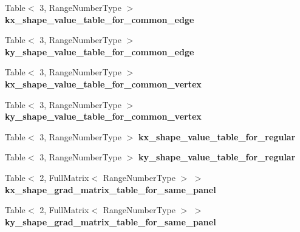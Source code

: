 \begin{DoxyCompactItemize}
\mbox{\label{classLaplaceBEM_1_1BEMValues_a8a1e35a97b8b4868d16098f9997a9148}} 
Table$<$ 3, Range\+Number\+Type $>$ {\bfseries kx\+\_\+shape\+\_\+value\+\_\+table\+\_\+for\+\_\+common\+\_\+edge}
\item 
\mbox{\label{classLaplaceBEM_1_1BEMValues_a26a0c28bae67e71bcd8e5b58c22096d3}} 
Table$<$ 3, Range\+Number\+Type $>$ {\bfseries ky\+\_\+shape\+\_\+value\+\_\+table\+\_\+for\+\_\+common\+\_\+edge}
\item 
\mbox{\label{classLaplaceBEM_1_1BEMValues_a8d2e45be4d32bae87467a9b249ea1ae8}} 
Table$<$ 3, Range\+Number\+Type $>$ {\bfseries kx\+\_\+shape\+\_\+value\+\_\+table\+\_\+for\+\_\+common\+\_\+vertex}
\item 
\mbox{\label{classLaplaceBEM_1_1BEMValues_ad9ef63cf6509fa3916ddf835293baf39}} 
Table$<$ 3, Range\+Number\+Type $>$ {\bfseries ky\+\_\+shape\+\_\+value\+\_\+table\+\_\+for\+\_\+common\+\_\+vertex}
\item 
\mbox{\label{classLaplaceBEM_1_1BEMValues_aef7b057d9bb7d63d74ac30c34b0add62}} 
Table$<$ 3, Range\+Number\+Type $>$ {\bfseries kx\+\_\+shape\+\_\+value\+\_\+table\+\_\+for\+\_\+regular}
\item 
\mbox{\label{classLaplaceBEM_1_1BEMValues_aec5f9fa16be14831e124275fe74921f0}} 
Table$<$ 3, Range\+Number\+Type $>$ {\bfseries ky\+\_\+shape\+\_\+value\+\_\+table\+\_\+for\+\_\+regular}
\item 
\mbox{\label{classLaplaceBEM_1_1BEMValues_a66a2d68e7fbc709fbca53c5d3158b288}} 
Table$<$ 2, Full\+Matrix$<$ Range\+Number\+Type $>$ $>$ {\bfseries kx\+\_\+shape\+\_\+grad\+\_\+matrix\+\_\+table\+\_\+for\+\_\+same\+\_\+panel}
\item 
\mbox{\label{classLaplaceBEM_1_1BEMValues_aea315427a1f1fec575cf6b9710907747}} 
Table$<$ 2, Full\+Matrix$<$ Range\+Number\+Type $>$ $>$ {\bfseries ky\+\_\+shape\+\_\+grad\+\_\+matrix\+\_\+table\+\_\+for\+\_\+same\+\_\+panel}
\item 
\mbox{\label{classLaplaceBEM_1_1BEMValues_ae25c2dc5d9aa6c4dfd5c05b41197a7ef}} 

\end{DoxyCompactItemize}
